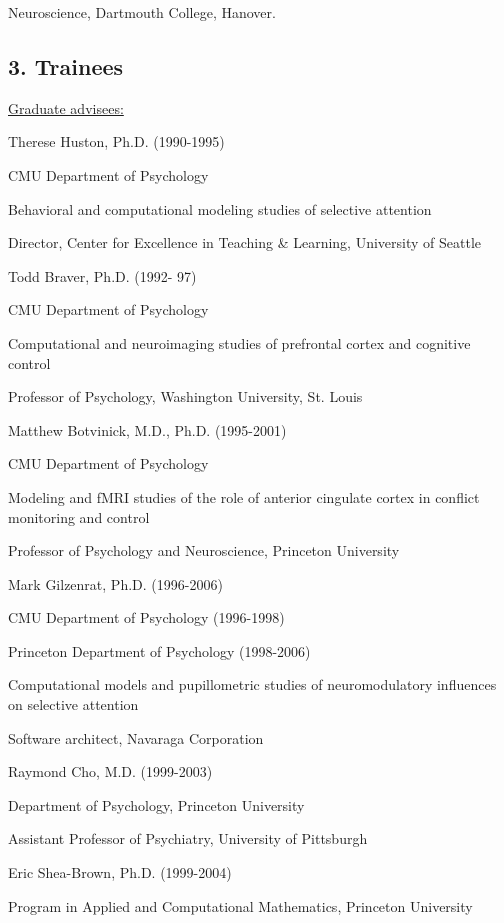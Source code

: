 \documentclass[10 pt]{article}
\begin{document}
\hspace{1.1in} Neuroscience, Dartmouth College, Hanover.
    \smallskip

\subsection*{3. Trainees} \label{secTEACHING3}
    \smallskip

{\fontsize{12pt}{16 pt}\selectfont \underline{Graduate advisees:}}
    \smallskip

Therese Huston, Ph.D. (1990-1995)

CMU Department of Psychology

Behavioral and computational modeling studies of selective attention

Director, Center for Excellence in Teaching \& Learning, University of Seattle
    \medskip

Todd Braver, Ph.D. (1992- 97)

CMU Department of Psychology

Computational and neuroimaging studies of prefrontal cortex and cognitive control

Professor of Psychology, Washington University, St. Louis
    \medskip

Matthew Botvinick, M.D., Ph.D. (1995-2001)

CMU Department of Psychology

Modeling and fMRI studies of the role of anterior cingulate cortex in conflict monitoring and control

Professor of Psychology and Neuroscience, Princeton University
    \medskip

Mark Gilzenrat, Ph.D. (1996-2006)

CMU Department of Psychology (1996-1998)

Princeton Department of Psychology (1998-2006)

Computational models and pupillometric studies of neuromodulatory influences on selective attention

Software architect, Navaraga Corporation
    \medskip

Raymond Cho, M.D. (1999-2003)

Department of Psychology, Princeton University

Assistant Professor of Psychiatry, University of Pittsburgh
    \medskip

Eric Shea-Brown, Ph.D. (1999-2004)

Program in Applied and Computational Mathematics, Princeton University
\end{document}
